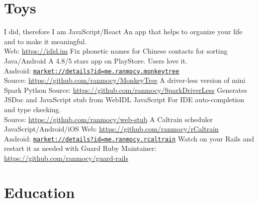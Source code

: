 \documentclass[]{friggeri-cv}
\begin{document}
\section{Toys}

\begin{entrylist}
  {I did, therefore I am}
  {JavaScript/React}
  {
    An app that helps to organize your life and to make it meaningful.\\
    Web: \url{https://idid.im}
  }
  {Fix phonetic names for Chinese contacts for sorting}
  {Java/Android}
  {
    A 4.8/5 stars app on PlayStore. Users love it.\\
    Android: \href{https://play.google.com/store/apps/details?id=me.ranmocy.monkeytree}{\texttt{market://details?id=me.ranmocy.monkeytree}}\\
    Source: \url{https://github.com/ranmocy/MonkeyTree}
  }
  {A driver-less version of mini Spark}
  {Python}
  {
    Source: \url{https://github.com/ranmocy/SparkDriverLess}
  }
  {Generates JSDoc and JavaScript stub from WebIDL}
  {JavaScript}
  {
    For IDE auto-completion and type checking.\\
    Source: \url{https://github.com/ranmocy/web-stub}
  }
  {A Caltrain scheduler}
  {JavaScript/Android/iOS}
  {
    Web: \url{https://github.com/ranmocy/rCaltrain}\\
    Android: \href{https://play.google.com/store/apps/details?id=me.ranmocy.rcaltrain}{\texttt{market://details?id=me.ranmocy.rcaltrain}}
  }
  {Watch on your Rails and restart it as needed with Guard}
  {Ruby}
  {
    Maintainer: \url{https://github.com/ranmocy/guard-rails}
  }
\end{entrylist}


\section{Education}
\end{document}
